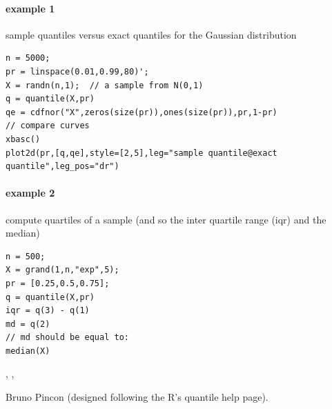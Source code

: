 \begin{examples}
\paragraph{example 1} sample quantiles versus exact quantiles for the Gaussian distribution
\begin{Verbatim}
n = 5000;
pr = linspace(0.01,0.99,80)';
X = randn(n,1);  // a sample from N(0,1)
q = quantile(X,pr)
qe = cdfnor("X",zeros(size(pr)),ones(size(pr)),pr,1-pr)
// compare curves
xbasc()
plot2d(pr,[q,qe],style=[2,5],leg="sample quantile@exact quantile",leg_pos="dr")
\end{Verbatim}

\paragraph{example 2} compute quartiles of a sample (and so the inter quartile range (iqr) and the median)
\begin{Verbatim}
n = 500;
X = grand(1,n,"exp",5);
pr = [0.25,0.5,0.75];
q = quantile(X,pr)
iqr = q(3) - q(1)
md = q(2)
// md should be equal to:
median(X)
\end{Verbatim}

\end{examples}

\begin{manseealso}
   , , 
\end{manseealso}

\begin{authors}
  Bruno Pincon (designed following the R's quantile help page).
\end{authors}
